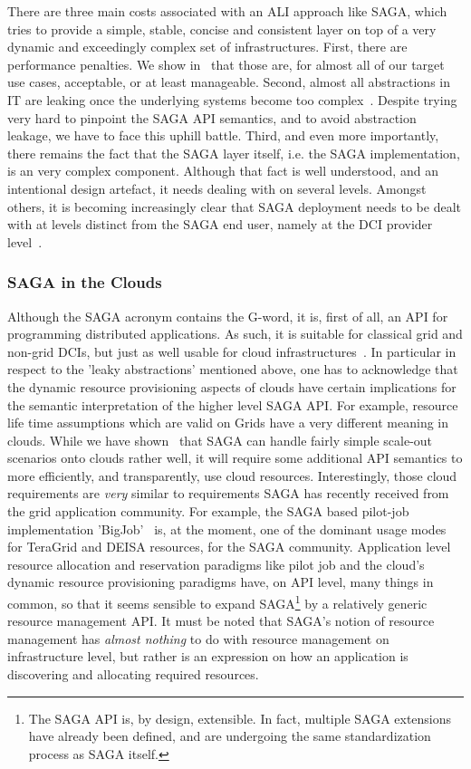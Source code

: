 \documentclass[10pt,conference,final,letterpaper,twoside,twocolumn,]{IEEEtran}
\newcommand{\I}[1]{\textit{#1}}
\begin{document}
  There are three main costs associated with an ALI approach like SAGA,
  which tries to provide a simple, stable, concise and consistent
  layer on top of a very dynamic and exceedingly complex set of
  infrastructures.  First, there are performance penalties.  We show
  in~\cite{sagaperf} that those are, for almost all of our target use
  cases, acceptable, or at least manageable.  Second, almost all
  abstractions in IT are leaking once the underlying systems become
  too complex~\cite{leaky_abstractions}.  Despite trying very hard to
  pinpoint the SAGA API semantics, and to avoid abstraction leakage,
  we have to face this uphill battle.  Third, and even more
  importantly, there remains the fact that the SAGA layer itself, i.e.
  the SAGA implementation, is an very complex component.  Although
  that fact is well understood, and an intentional design artefact, it
  needs dealing with on several levels.  Amongst others, it is
  becoming increasingly clear that SAGA deployment needs to be dealt
  with at levels distinct from the SAGA end user, namely at the DCI
  provider level~\cite{UMD,XD,TG}.


 \subsubsection*{SAGA in the Clouds}

  Although the SAGA acronym contains the G-word, it is, first of all, an
  API for programming distributed applications.  As such, it is
  suitable for classical grid and non-grid DCIs, but just as well
  usable for cloud infrastructures~\cite{sagacloud...}.  In particular
  in respect to the 'leaky abstractions' mentioned above, one has to
  acknowledge that the dynamic resource provisioning aspects of clouds
  have certain implications for the semantic interpretation of the
  higher level SAGA API.  For example, resource life time assumptions
  which are valid on Grids have a very different meaning in clouds.
  While we have shown~\cite{sagacloud...} that SAGA can handle fairly
  simple scale-out scenarios onto clouds rather well, it will require
  some additional API semantics to more efficiently, and
  transparently, use cloud resources.  Interestingly, those cloud
  requirements are \I{very} similar to requirements SAGA has recently
  received from the grid application community.  For example,
  the SAGA based pilot-job implementation 'BigJob'~\cite{bigjob} is,
  at the moment, one of the dominant usage modes for TeraGrid and
  DEISA resources, for the SAGA community.  Application level resource
  allocation and reservation paradigms like pilot job and the cloud's
  dynamic resource provisioning paradigms have, on API level, many
  things in common, so that it seems sensible to expand
  SAGA\footnote{The SAGA API is, by design, extensible.  In fact,
  multiple SAGA extensions have already been defined, and are
  undergoing the same standardization process as SAGA itself.} by a
  relatively generic resource management API.  It must be noted that
  SAGA's notion of resource management has \I{almost nothing} to do
  with resource management on infrastructure level, but rather is an
  expression on how an application is discovering and allocating
  required resources.
  
\end{document}
